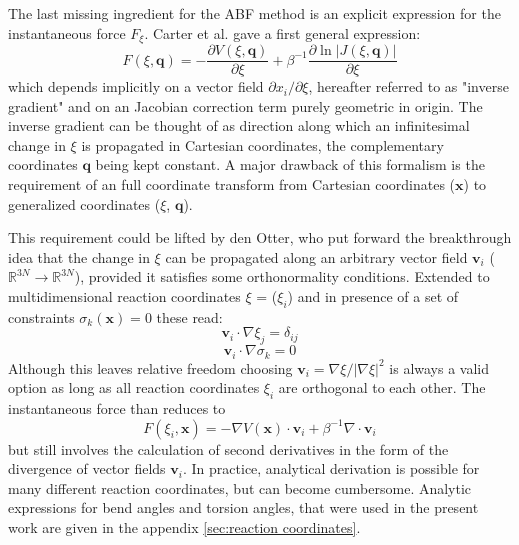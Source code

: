 The last missing ingredient for the ABF method is an explicit expression for the instantaneous force $F_{\xi}$. Carter et al.\autocite{carter1989constrained} gave a first general expression:
\begin{equation}
  F(\xi,\textbf{q}) = -\frac{\partial V(\xi,\textbf{q})}{\partial \xi} + \beta^{-1} \frac{\partial \ln|J(\xi,\textbf{q})|}{\partial\xi}
\end{equation}
which depends implicitly on a vector field $\partial x_i / \partial \xi$, hereafter referred to as "inverse gradient" and on an Jacobian correction term purely geometric in origin. The inverse gradient can be thought of as direction along which an infinitesimal change in $\xi$ is propagated in Cartesian coordinates, the complementary coordinates $\textbf{q}$ being kept constant. A major drawback of this formalism is the requirement of an full coordinate transform from Cartesian coordinates ($\textbf{x}$) to generalized coordinates ($\xi$, $\textbf{q}$).

This requirement could be lifted by den Otter\autocite{den2000thermodynamic}, who put forward the breakthrough idea that the change in $\xi$ can be propagated along an arbitrary vector field $\textbf{v}_i$ ($\mathbb{R}^{3N} \to \mathbb{R}^{3N}$), provided it satisfies some orthonormality conditions.
Extended to multidimensional reaction coordinates \textbf{$\xi$} = ($\xi_i$) and in presence of a set of constraints $\sigma_{k}(\textbf{x})=0$ these read:\autocite{ciccotti2005blue}
\begin{equation}
  \textbf{v}_i \cdot \nabla \xi_j = \delta_{ij} \label{eq:cond1}
\end{equation}
\begin{equation}
  \textbf{v}_i \cdot \nabla \sigma_k = 0 \label{eq:cond2}
\end{equation}
Although this leaves relative freedom choosing $\textbf{v}_i = \nabla \xi/|\nabla \xi|^2$ is always a valid option as long as all reaction coordinates $\xi_i$ are orthogonal to each other.
The instantaneous force than reduces to
\begin{equation}
  F(\xi_i,\textbf{x}) = -\nabla V(\textbf{x}) \cdot \textbf{v}_i + \beta^{-1} \nabla \cdot \textbf{v}_i
\end{equation}
but still involves the calculation of second derivatives in the form of the divergence of vector fields $\textbf{v}_i$.\autocite{comer2015adaptive} In practice, analytical derivation is possible for many different reaction coordinates, but can become cumbersome.\autocite{fiorin2013using} Analytic expressions for bend angles and torsion angles, that were used in the present work are given in the appendix \ref{sec:reaction coordinates}.

